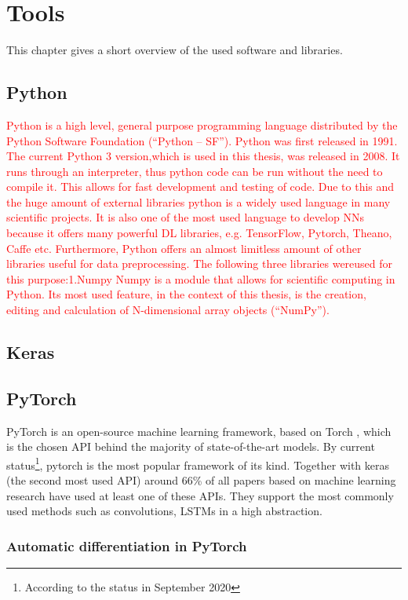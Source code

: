 \section{Tools}
This chapter gives a short overview of the used software and libraries.

\subsection{Python}
\textcolor{red}{Python is a high level, general purpose programming language distributed by the Python Software Foundation (“Python – SF”). Python was first released in 1991. The current Python 3 version,which is used in this thesis, was released in 2008. It runs through an interpreter, thus python code can be run without the need to compile it. This allows for fast development and testing of code. Due to this and the huge amount of external libraries python is a widely used language in many scientific projects. It is also one of the most used language to develop NNs because it offers many powerful DL libraries, e.g. TensorFlow, Pytorch, Theano, Caffe etc. Furthermore, Python offers an almost limitless amount of other libraries useful for data preprocessing. The following three libraries wereused for this purpose:1.Numpy Numpy is a module that allows for scientific computing in Python. Its most used feature, in the context of this thesis, is the creation, editing and calculation of N-dimensional array objects (“NumPy”).}

\subsection{Keras}
\subsection{PyTorch} \label{cap:pytorch}
PyTorch \cite{pytorch}is an open-source machine learning framework, based on Torch \cite{torch}, which is the chosen API behind the majority of state-of-the-art models. By current status\footnote{According to the status in September 2020}, pytorch is the most popular framework of its kind. Together with keras (the second most used API) around 66\% of all papers based on machine learning research have used at least one of these APIs.
They support the most commonly used methods such as convolutions, LSTMs in a high abstraction.

\subsubsection{Automatic differentiation in PyTorch}

